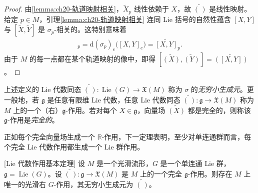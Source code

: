 \documentclass[../../main.tex]{subfiles}
\begin{document}
\begin{proof}
由\eqref{lemma:ch20-轨道映射相关}，$\widetilde X_p$ 线性依赖于 $X$，故 $\widetilde{(\,)}$ 是线性映射。给定 $p\in M$，引理\cref{lemma:ch20-轨道映射相关} 连同 Lie 括号的自然性蕴含 $[X,Y]$ 与 $[\widetilde X,\widetilde Y]$ 是 $\sigma_p$-相关的。这特别意味着
\begin{align*}
[\widetilde X,\widetilde Y]_p=\mathrm{d}(\sigma_p)_e\bigl([X,Y]_e\bigr)=\widetilde{[X,Y]}_p.
\end{align*}
由于 $M$ 的每一点都在某个轨道映射的像中，即得 $[\widetilde{(X)},\widetilde{(Y)}]=\widetilde{([X,Y])}$。
\end{proof}

上述定义的 Lie 代数同态 $\widetilde{(\,)}\colon\operatorname{Lie}(G)\to\mathfrak X(M)$ 称为 $\sigma$ 的\emph{无穷小生成元}。更一般地，若 $\mathfrak g$ 是任意有限维 Lie 代数，任意 Lie 代数同态 $\widetilde{(\,)}\colon\mathfrak g\to\mathfrak X(M)$ 称为 $M$ 上的一个（右）$\mathfrak g$-作用。若对每个 $X\in\mathfrak g$，向量场 $\widetilde{(X)}$ 都是完全的，则称该 $\mathfrak g$-作用是\emph{完全的}。

正如每个完全向量场生成一个 $\mathbb{R}$-作用，下一定理表明，至少对单连通群而言，每个完全 Lie 代数作用都生成一个 Lie 群作用。

\begin{theorem}{[Lie 代数作用基本定理]}\label{theorem:ch20-Lie代数作用基本定理}
设 $M$ 是一个光滑流形，$G$ 是一个单连通 Lie 群，$\mathfrak g=\operatorname{Lie}(G)$。设 $\widetilde{(\,)}\colon\mathfrak g\to\mathfrak X(M)$ 是 $M$ 上的一个完全 $\mathfrak g$-作用。则存在 $M$ 上唯一的光滑右 $G$-作用，其无穷小生成元为 $\widetilde{(\,)}$。
\end{theorem}
\end{document}
